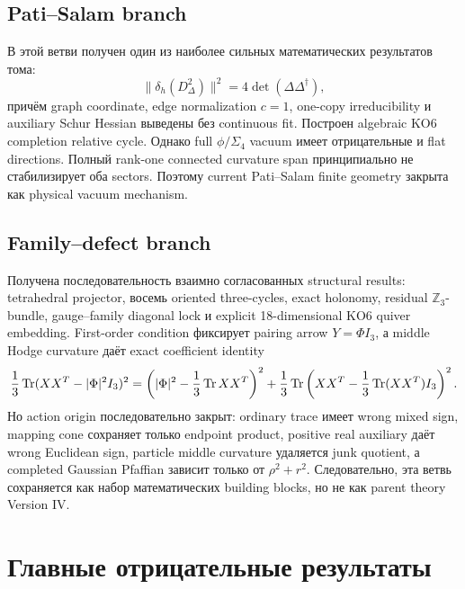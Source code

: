 \subsection{Pati--Salam branch}

В этой ветви получен один из наиболее сильных математических результатов
тома:
\begin{equation}
 \|\delta_h(D_\Delta^2)\|^2
 =4\det(\Delta\Delta^\dagger),
\end{equation}
причём graph coordinate, edge normalization \(c=1\), one-copy
irreducibility и auxiliary Schur Hessian выведены без continuous fit.
Построен algebraic KO6 completion relative cycle. Однако full
\(\phi/\Sigma_4\) vacuum имеет отрицательные и flat directions. Полный
rank-one connected curvature span принципиально не стабилизирует оба
sectors. Поэтому current Pati--Salam finite geometry закрыта как physical
vacuum mechanism.

\subsection{Family--defect branch}

Получена последовательность взаимно согласованных structural results:
tetrahedral projector, восемь oriented three-cycles, exact holonomy,
residual \(\mathbb Z_3\)-bundle, gauge--family diagonal lock и explicit
18-dimensional KO6 quiver embedding. First-order condition фиксирует
pairing arrow \(Y=\Phi I_3\), а middle Hodge curvature даёт exact
coefficient identity
\begin{equation}
 \frac13\operatorname{Tr}(XX^T-|\Phi|^2I_3)^2
 =\left(|\Phi|^2-\frac13\operatorname{Tr} XX^T\right)^2
 +\frac13\operatorname{Tr}\left(XX^T-\frac13\operatorname{Tr}(XX^T)I_3\right)^2.
\end{equation}
Но action origin последовательно закрыт: ordinary trace имеет wrong mixed
sign, mapping cone сохраняет только endpoint product, positive real
auxiliary даёт wrong Euclidean sign, particle middle curvature удаляется
junk quotient, а completed Gaussian Pfaffian зависит только от
\(\rho^2+r^2\). Следовательно, эта ветвь сохраняется как набор
математических building blocks, но не как parent theory Version IV.

\section{Главные отрицательные результаты}

